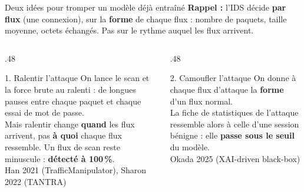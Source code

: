 \documentclass[aspectratio=169,11pt,xcolor=table]{beamer}
\begin{document}
\begin{frame}{Deux idées pour tromper un modèle déjà entraîné}
  \textbf{Rappel :} l'IDS décide \textbf{par flux} (une connexion), sur la \textbf{forme} de chaque flux : nombre de paquets, taille moyenne, octets échangés. Pas sur le rythme auquel les flux arrivent.
  \vspace{.6em}

  \begin{columns}[T]
    \begin{column}{.48\linewidth}
      \begin{block}{1. Ralentir l'attaque}
        On lance le scan et la force brute au ralenti : de longues pauses entre chaque paquet et chaque essai de mot de passe.\\[.4em]
        Mais ralentir change \textbf{quand} les flux arrivent, pas \textbf{à quoi} chaque flux ressemble. Un flux de scan reste minuscule : \textbf{détecté à 100\,\%}.\\[.4em]
        {\footnotesize\color{projectblue}Han 2021 (TrafficManipulator), Sharon 2022 (TANTRA)}
      \end{block}
    \end{column}
    \begin{column}{.48\linewidth}
      \begin{block}{2. Camoufler l'attaque}
        On donne à chaque flux d'attaque la \textbf{forme} d'un flux normal.\\[.4em]
        La fiche de statistiques de l'attaque ressemble alors à celle d'une session bénigne : elle \textbf{passe sous le seuil} du modèle.\\[.4em]
        {\footnotesize\color{projectblue}Okada 2025 (XAI-driven black-box)}
      \end{block}
    \end{column}
  \end{columns}
\end{frame}
\end{document}
